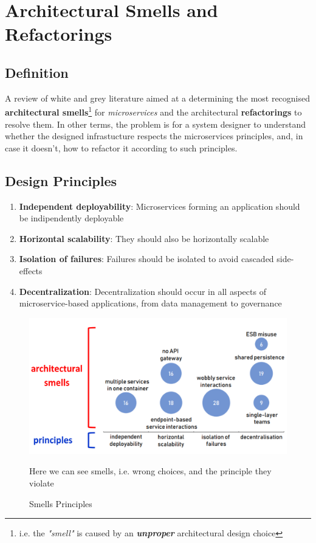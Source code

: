 \chapter{Architectural Smells and Refactorings}
\section{Definition}
A review of white and grey literature aimed at a determining the most recognised \textbf{architectural smells}\footnote{i.e. the \textit{"smell"} is caused by an \textbf{\textit{unproper}} architectural design choice} for \textit{microservices} and the architectural \textbf{refactorings} to resolve them.
In other terms, the problem is for a system designer to understand whether the designed infrastucture respects the microservices principles,
and, in case it doesn't, how to refactor it according to such principles.

\section{Design Principles}
\begin{enumerate}
   \item \textbf{Independent deployability}:
   Microservices forming an application should be indipendently deployable
   \item \textbf{Horizontal scalability}:
   They should also be horizontally scalable
   \item \textbf{Isolation of failures}:
   Failures should be isolated to avoid cascaded side-effects
   \item \textbf{Decentralization}:
   Decentralization should occur in all aspects of microservice-based applications,
   from data management to governance
\end{enumerate}

\begin{figure}[htbp]
   \centering
   \includegraphics{images/smells_principles.png}
   \caption{Smells Principles}
   Here we can see smells, i.e. wrong choices, and the principle they violate
   \label{fig:smells_principles}
\end{figure}

